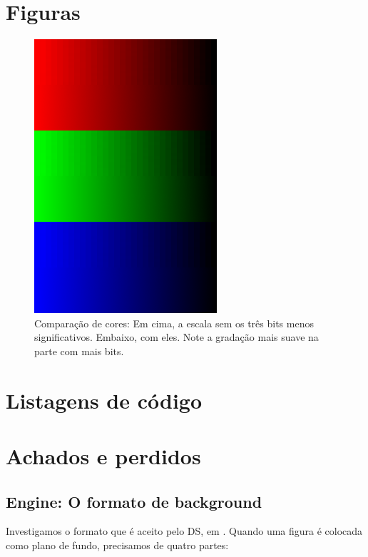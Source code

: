 \chapter{Figuras}

\begin{figure}[h]
\centering
\includegraphics{imgs/diferenca_cor.png}
\caption[Comparação de cores]{Comparação de cores: Em cima, a escala sem os três bits menos significativos. Embaixo, com eles. Note a gradação mais suave na parte com mais bits.}
\label{img:comparacao} 
\end{figure}

\chapter{Listagens de código}





\chapter{Achados e perdidos}

\section{Engine: O formato de background}

Investigamos o formato que é aceito pelo DS, em \cite{DSSpec}. Quando uma figura é colocada como plano de fundo, precisamos de quatro partes:

